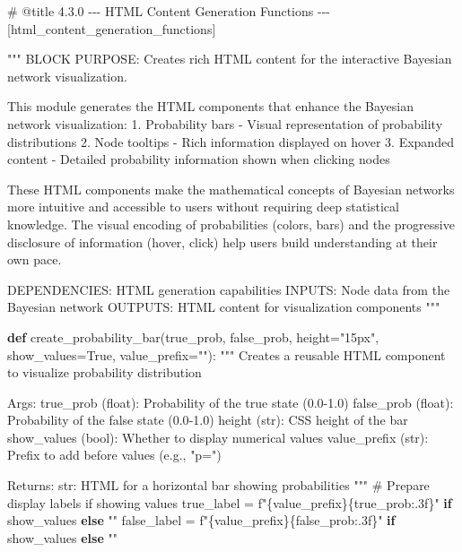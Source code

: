 \documentclass[
  11pt,
  letterpaper,
]{book}
\newenvironment{Shaded}{\begin{snugshade}}{\end{snugshade}}
\newcommand{\CommentTok}[1]{\textcolor[rgb]{0.37,0.37,0.37}{#1}}
\newcommand{\ControlFlowTok}[1]{\textcolor[rgb]{0.00,0.23,0.31}{\textbf{#1}}}
\newcommand{\KeywordTok}[1]{\textcolor[rgb]{0.00,0.23,0.31}{\textbf{#1}}}
\newcommand{\NormalTok}[1]{\textcolor[rgb]{0.00,0.23,0.31}{#1}}
\newcommand{\OperatorTok}[1]{\textcolor[rgb]{0.37,0.37,0.37}{#1}}
\newcommand{\SpecialCharTok}[1]{\textcolor[rgb]{0.37,0.37,0.37}{#1}}
\newcommand{\SpecialStringTok}[1]{\textcolor[rgb]{0.13,0.47,0.30}{#1}}
\newcommand{\StringTok}[1]{\textcolor[rgb]{0.13,0.47,0.30}{#1}}
\newcommand{\VariableTok}[1]{\textcolor[rgb]{0.07,0.07,0.07}{#1}}
\begin{document}
\label{html_content_generation_functions}
\begin{Shaded}
\begin{Highlighting}[]
\CommentTok{\# @title 4.3.0 {-}{-}{-} HTML Content Generation Functions {-}{-}{-} [html\_content\_generation\_functions]}

\CommentTok{"""}
\CommentTok{BLOCK PURPOSE: Creates rich HTML content for the interactive Bayesian network visualization.}

\CommentTok{This module generates the HTML components that enhance the Bayesian network}
\CommentTok{visualization:}
\CommentTok{1. Probability bars {-} Visual representation of probability distributions}
\CommentTok{2. Node tooltips {-} Rich information displayed on hover}
\CommentTok{3. Expanded content {-} Detailed probability information shown when clicking nodes}

\CommentTok{These HTML components make the mathematical concepts of Bayesian networks more}
\CommentTok{intuitive and accessible to users without requiring deep statistical knowledge.}
\CommentTok{The visual encoding of probabilities (colors, bars) and the progressive}
\CommentTok{disclosure of information (hover, click) help users build understanding at}
\CommentTok{their own pace.}

\CommentTok{DEPENDENCIES: HTML generation capabilities}
\CommentTok{INPUTS: Node data from the Bayesian network}
\CommentTok{OUTPUTS: HTML content for visualization components}
\CommentTok{"""}

\KeywordTok{def}\NormalTok{ create\_probability\_bar(true\_prob, false\_prob, height}\OperatorTok{=}\StringTok{"15px"}\NormalTok{, show\_values}\OperatorTok{=}\VariableTok{True}\NormalTok{, value\_prefix}\OperatorTok{=}\StringTok{""}\NormalTok{):}
    \CommentTok{"""}
\CommentTok{    Creates a reusable HTML component to visualize probability distribution}

\CommentTok{    Args:}
\CommentTok{        true\_prob (float): Probability of the true state (0.0{-}1.0)}
\CommentTok{        false\_prob (float): Probability of the false state (0.0{-}1.0)}
\CommentTok{        height (str): CSS height of the bar}
\CommentTok{        show\_values (bool): Whether to display numerical values}
\CommentTok{        value\_prefix (str): Prefix to add before values (e.g., "p=")}

\CommentTok{    Returns:}
\CommentTok{        str: HTML for a horizontal bar showing probabilities}
\CommentTok{    """}
    \CommentTok{\# Prepare display labels if showing values}
\NormalTok{    true\_label }\OperatorTok{=} \SpecialStringTok{f"}\SpecialCharTok{\{}\NormalTok{value\_prefix}\SpecialCharTok{\}\{}\NormalTok{true\_prob}\SpecialCharTok{:.3f\}}\SpecialStringTok{"} \ControlFlowTok{if}\NormalTok{ show\_values }\ControlFlowTok{else} \StringTok{""}
\NormalTok{    false\_label }\OperatorTok{=} \SpecialStringTok{f"}\SpecialCharTok{\{}\NormalTok{value\_prefix}\SpecialCharTok{\}\{}\NormalTok{false\_prob}\SpecialCharTok{:.3f\}}\SpecialStringTok{"} \ControlFlowTok{if}\NormalTok{ show\_values }\ControlFlowTok{else} \StringTok{""}


\end{Highlighting}
\end{Shaded}
\end{document}
